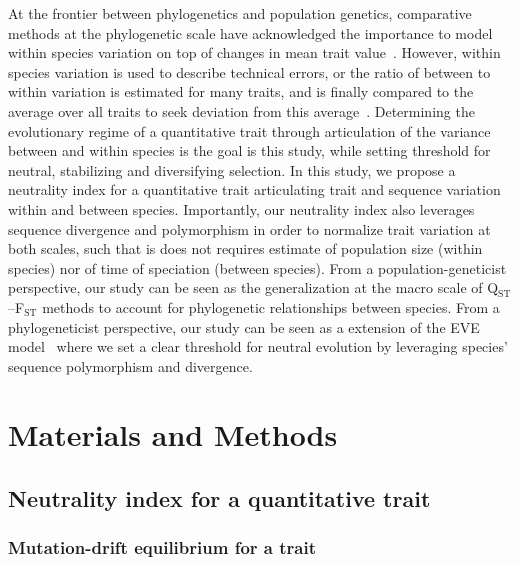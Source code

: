 \documentclass{article}
\begin{document}
At the frontier between phylogenetics and population genetics, comparative methods at the phylogenetic scale have acknowledged the importance to model within species variation on top of changes in mean trait value~\cite{fay_evaluating_2008, kostikova_bridging_2016, gaboriau_multiplatform_2020}.
However, within species variation is used to describe technical errors, or the ratio of between to within variation is estimated for many traits, and is finally compared to the average over all traits to seek deviation from this average~\cite{rohlfs_modeling_2014, rohlfs_phylogenetic_2015}.
Determining the evolutionary regime of a quantitative trait through articulation of the variance between and within species is the goal is this study, while setting threshold for neutral, stabilizing and diversifying selection.
In this study, we propose a neutrality index for a quantitative trait articulating trait and sequence variation within and between species.
Importantly, our neutrality index also leverages sequence divergence and polymorphism in order to normalize trait variation at both scales, such that is does not requires estimate of population size (within species) nor of time of speciation (between species).
From a population-geneticist perspective, our study can be seen as the generalization at the macro scale of Q$_\text{ST}$--F$_\text{ST}$ methods to account for phylogenetic relationships between species.
From a phylogeneticist perspective, our study can be seen as a extension of the EVE model~\cite{rohlfs_modeling_2014, rohlfs_phylogenetic_2015} where we set a clear threshold for neutral evolution by leveraging species' sequence polymorphism and divergence.

\section*{Materials and Methods}\label{sec:materials-and-methods}
\subsection*{Neutrality index for a quantitative trait}\label{subsec:neutrality-index-for-a-quantitative-trait}
\subsubsection*{Mutation-drift equilibrium for a trait}
\end{document}
